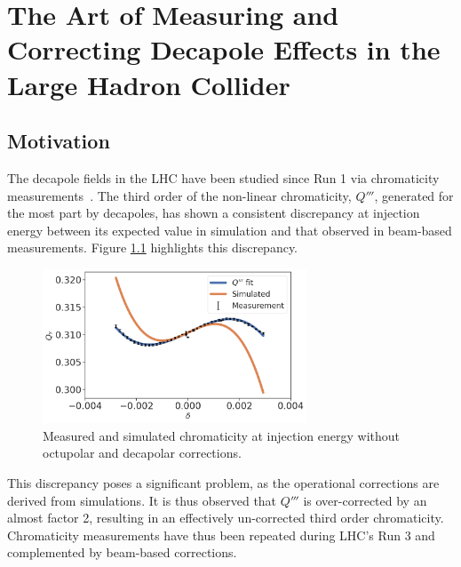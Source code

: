 \chapter{The Art of Measuring and Correcting Decapole Effects in the Large Hadron Collider}
\thumbforchapter{}
\chaptertoc{}
\newpage

\section{Motivation}

The decapole fields in the LHC have been studied since Run 1 via chromaticity 
measurements~\cite{maclean_non-linear_2011,maclean_commissioning_2016,maclean_measurement_2014}. 
The third order of the non-linear chromaticity, $Q'''$, generated for the most part by decapoles,
has shown a consistent discrepancy at injection energy between its expected value in simulation and
that observed in beam-based measurements.
Figure \ref{fig:decapoles:bare_chroma_vs_simulations} highlights this discrepancy.

\begin{figure}[H]
    \centering
    \includegraphics[width=0.7\textwidth]{images/bare_chroma_simulated.png}
    \caption{Measured and simulated chromaticity at injection energy without octupolar and
             decapolar corrections. }
    \label{fig:decapoles:bare_chroma_vs_simulations}
\end{figure}

This discrepancy poses a significant problem, as the operational corrections are derived from
simulations. It is thus observed that $Q'''$ is over-corrected by an almost factor 2, resulting in
an effectively un-corrected third order chromaticity.
Chromaticity measurements have thus been repeated during LHC's Run 3 and complemented by beam-based
corrections.

